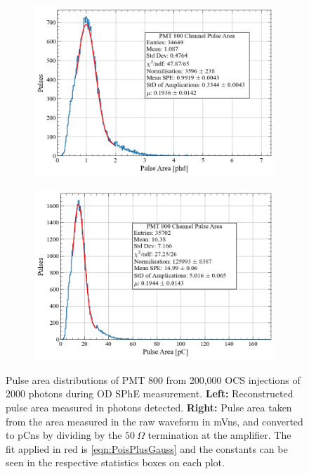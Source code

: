 \begin{figure}
     \centering
     \begin{subfigure}[b]{0.47\textwidth}
         \centering
         \includegraphics[width=\textwidth]{figures/ODCommissioning/PMT800_PulseArea_Distribution.png}
         \caption{}
         \label{fig:ODCommissioning/ODSPhE_phd}
     \end{subfigure}
     \begin{subfigure}[b]{0.47\textwidth}
         \centering
         \includegraphics[width=\textwidth]{figures/ODCommissioning/PMT800_PulseArea_Distribution_pC.png}
         \caption{}
         \label{fig:ODCommissioning/ODSPhE_pC}
     \end{subfigure}
        \caption[Pulse area distributions of PMT 800 from 200,000 OCS injections of 2000 photons during OD SPhE measurement.]{Pulse area distributions of PMT 800 from 200,000 OCS injections of 2000 photons during OD SPhE measurement. \textbf{Left:} Reconstructed pulse area measured in photons detected. \textbf{Right:} Pulse area taken from the area measured in the raw waveform in mVns, and converted to pCns by dividing by the $50~\Omega$ termination at the amplifier. The fit applied in red is \autoref{eqn:PoisPlusGauss} and the constants can be seen in the respective statistics boxes on each plot.}
        \label{fig:ODCommissioning/ODSPhEDists}
\end{figure}
